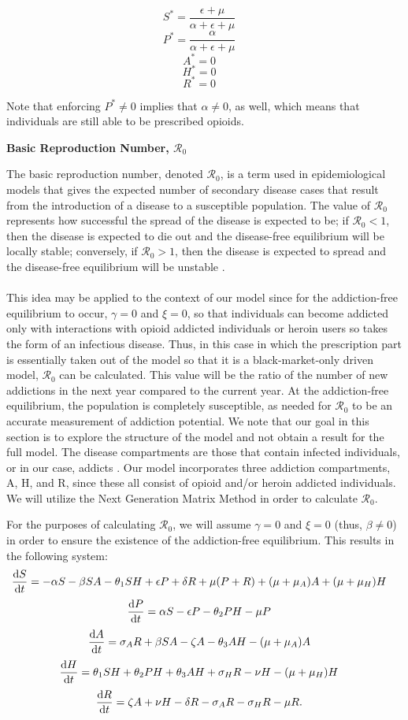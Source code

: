 \documentclass[12pt]{article}
\begin{document}
\[S^*=\frac{\epsilon + \mu}{\alpha + \epsilon +\mu}\quad\]
\[P^*=\frac{\alpha}{\alpha + \epsilon +\mu}\quad\]
\[A^*=0\quad\]
\[H^*=0\quad\]
\[R^*=0\quad\] 

Note that enforcing $P^* \neq 0$ implies that $\alpha \neq 0$, as well, which means that individuals are still able to be prescribed opioids. 

\textbf{Basic Reproduction Number, \textbf{$\mathscr{R}_0$}}

The basic reproduction number, denoted $\mathscr{R}_0$, is a term used in epidemiological models that gives the expected number of secondary disease cases that result from the introduction of a disease to a susceptible population. The value of $\mathscr{R}_0$ represents how successful the spread of the disease is expected to be; if $\mathscr{R}_0 < 1$, then the disease is expected to die out and the disease-free equilibrium will be locally stable; conversely, if $\mathscr{R}_0 >1$, then the disease is expected to spread and the disease-free equilibrium will be unstable \cite{Driessche}. \\ \\
 This idea may be applied to the context of our model since for the addiction-free equilibrium to occur, $\gamma=0$ and $\xi=0$, so that individuals can become addicted only with interactions with opioid addicted individuals or heroin users so takes the form of an infectious disease. Thus, in this case in which the prescription part is essentially taken out of the model so that it is a black-market-only driven model, $\mathscr{R}_0$ can be calculated. This value will be the ratio of the number of new addictions in the next year compared to the current year. At the addiction-free equilibrium, the population is completely susceptible, as needed for $\mathscr{R}_0$ to be an accurate measurement of addiction potential. 
We note that our goal in this section is to explore the structure of the model and not obtain a result for the full model. The disease compartments are those that contain infected individuals, or in our case, addicts \cite{Driessche}. Our model incorporates three addiction compartments, A, H, and R, since these all consist of opioid and/or heroin addicted individuals. We will utilize the Next Generation Matrix Method in order to calculate $\mathscr{R}_0$.


For the purposes of calculating $\mathscr{R}_0$, we will assume $\gamma =0$ and $\xi =0$ (thus, $\beta \neq 0$) in order to ensure the existence of the addiction-free equilibrium. This results in the following system:
\[\dv{S}{t} = -\alpha S - \beta SA  - \theta_{1} SH +\epsilon P +\delta R +\mu (P+R) + (\mu+\mu_{A})A + (\mu+\mu_{H}) H \quad \] 
\[\dv{P}{t} = \alpha S - \epsilon P  - \theta_{2}PH- \mu P    \quad\]
\[\dv{A}{t} = \sigma_{A} R +\beta SA  -\zeta A - \theta_{3}AH-(\mu + \mu_{A})A   \quad\]
\[\dv{H}{t} = \theta_{1}SH+\theta_{2}PH+\theta_{3}AH + \sigma_{H}R-\nu H-(\mu+\mu_{H})H  \quad\]
\[\dv{R}{t} = \zeta A +\nu H -\delta R -\sigma_{A}R-\sigma_{H}R -\mu R.\quad\]
\end{document}
